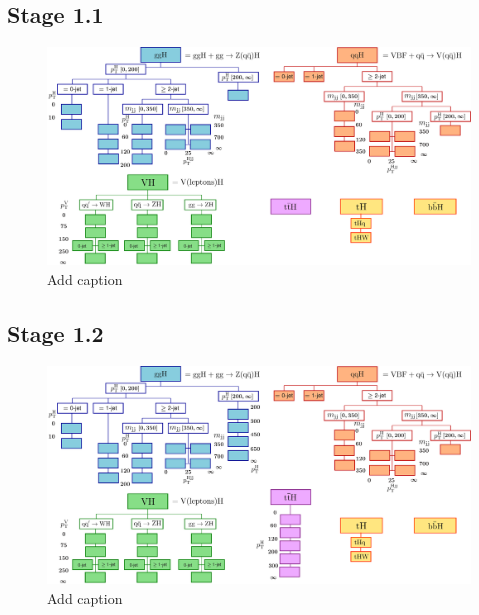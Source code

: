 \subsection{Stage 1.1}
\begin{figure}[htb!]
  \centering
  \includegraphics[width=1\linewidth]{Figures/app_merging_schemes/stage1p1.pdf}
  \caption[Schematic of the STXS stage 1.1 binning scheme]
  {
    Add caption
  }
  \label{fig:stxs_schematic_stage1p1}
\end{figure}

\FloatBarrier
\subsection{Stage 1.2}
\begin{figure}[htb!]
  \centering
  \includegraphics[width=1\linewidth]{Figures/app_merging_schemes/stage1p2.pdf}
  \caption[Schematic of the STXS stage 1.2 binning scheme]
  {
    Add caption
  }
  \label{fig:stxs_schematic_stage1p2}
\end{figure}
